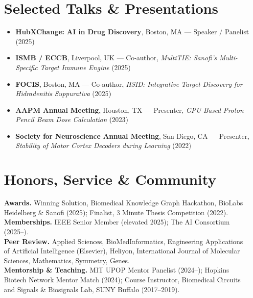 \documentclass[11pt,letterpaper]{article}
\begin{document}
\section*{Selected Talks \& Presentations}
\begin{itemize}
  \item \textbf{HubXChange: AI in Drug Discovery}, Boston, MA --- Speaker / Panelist (2025)
  \item \textbf{ISMB / ECCB}, Liverpool, UK --- Co-author, \textit{MultiTIE: Sanofi's Multi-Specific Target Immune Engine} (2025)
  \item \textbf{FOCIS}, Boston, MA --- Co-author, \textit{HSID: Integrative Target Discovery for Hidradenitis Suppurativa} (2025)
  \item \textbf{AAPM Annual Meeting}, Houston, TX --- Presenter, \textit{GPU-Based Proton Pencil Beam Dose Calculation} (2023)
  \item \textbf{Society for Neuroscience Annual Meeting}, San Diego, CA --- Presenter, \textit{Stability of Motor Cortex Decoders during Learning} (2022)
\end{itemize}

\section*{Honors, Service \& Community}
\textbf{Awards.} Winning Solution, Biomedical Knowledge Graph Hackathon, BioLabs Heidelberg \& Sanofi (2025);
Finalist, 3 Minute Thesis Competition (2022).\\[3pt]
\textbf{Memberships.} IEEE Senior Member (elevated 2025); The AI Consortium (2025--).\\[3pt]
\textbf{Peer Review.} Applied Sciences, BioMedInformatics, Engineering Applications of Artificial
Intelligence (Elsevier), Heliyon, International Journal of Molecular Sciences, Mathematics, Symmetry,
Genes.\\[3pt]
\textbf{Mentorship \& Teaching.} MIT UPOP Mentor Panelist (2024--); Hopkins Biotech Network Mentor Match
(2024); Course Instructor, Biomedical Circuits and Signals \& Biosignals Lab, SUNY Buffalo (2017--2019).
\end{document}
